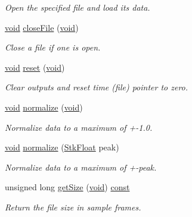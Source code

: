 \begin{DoxyCompactItemize}
\begin{DoxyCompactList}\small\item\em Open the specified file and load its data. \end{DoxyCompactList}\item 
\hyperlink{sound_8c_ae35f5844602719cf66324f4de2a658b3}{void} \hyperlink{class_nyq_1_1_file_wv_in_a1199413644c2be994b71df8fd0816ea1}{close\+File} (\hyperlink{sound_8c_ae35f5844602719cf66324f4de2a658b3}{void})
\begin{DoxyCompactList}\small\item\em Close a file if one is open. \end{DoxyCompactList}\item 
\hyperlink{sound_8c_ae35f5844602719cf66324f4de2a658b3}{void} \hyperlink{class_nyq_1_1_file_wv_in_a2dc6c665ad8594a6065fcf8e65b34aad}{reset} (\hyperlink{sound_8c_ae35f5844602719cf66324f4de2a658b3}{void})
\begin{DoxyCompactList}\small\item\em Clear outputs and reset time (file) pointer to zero. \end{DoxyCompactList}\item 
\hyperlink{sound_8c_ae35f5844602719cf66324f4de2a658b3}{void} \hyperlink{class_nyq_1_1_file_wv_in_a8d55fb0325338cfcf564c8bbe748ec18}{normalize} (\hyperlink{sound_8c_ae35f5844602719cf66324f4de2a658b3}{void})
\begin{DoxyCompactList}\small\item\em Normalize data to a maximum of +-\/1.0. \end{DoxyCompactList}\item 
\hyperlink{sound_8c_ae35f5844602719cf66324f4de2a658b3}{void} \hyperlink{class_nyq_1_1_file_wv_in_a628100238ff1a4922437c972a7d82212}{normalize} (\hyperlink{namespace_nyq_a044fa20a706520a617bbbf458a7db7e4}{Stk\+Float} peak)
\begin{DoxyCompactList}\small\item\em Normalize data to a maximum of {\itshape +-\/peak}. \end{DoxyCompactList}\item 
unsigned long \hyperlink{class_nyq_1_1_file_wv_in_a862f73407f08590f943290e77cf9fda5}{get\+Size} (\hyperlink{sound_8c_ae35f5844602719cf66324f4de2a658b3}{void}) \hyperlink{getopt1_8c_a2c212835823e3c54a8ab6d95c652660e}{const} 
\begin{DoxyCompactList}\small\item\em Return the file size in sample frames. \end{DoxyCompactList}\item 

\end{DoxyCompactItemize}
